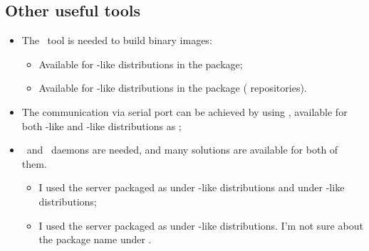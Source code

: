 
\subsection{ Other useful tools } \label{sub:OtherTools}

    \begin{itemize}

    \item  The \mkimage\ tool is needed to build binary images:

        \begin{itemize}
        \item   Available for \Debian-like distributions in the
                 package;
        \item   Available for \RedHat-like distributions in the
                 package (
                repositories).
        \end{itemize}

    \item   The communication via serial port can be achieved by using
            \Minicom, available for both \Debian-like and \RedHat-like
            distributions as ;

    \item   \BootP\ and \TFTP\ daemons are needed, and many solutions are
            available for both of them.
            \begin{itemize}
            \item   I used the server packaged as 
                    under \Debian-like distributions and
                     under \RedHat-like
                    distributions;
            \item   I used the server packaged as 
                    under \Debian-like distributions. I'm not sure about
                    the package name under \RedHat.
            \end{itemize}

    \end{itemize}

